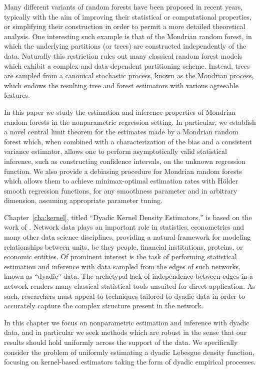 Many different variants of random forests have been proposed in
recent years, typically with the aim of improving their statistical or
computational properties, or simplifying their construction in order to
permit a more detailed theoretical analysis.
One interesting such example is that of the Mondrian random forest,
in which the underlying partitions (or trees) are constructed
independently of the data. Naturally this restriction rules out many
classical random forest models which exhibit a complex and data-dependent
partitioning scheme. Instead, trees are sampled from a canonical
stochastic process, known as the Mondrian process, which endows the resulting
tree and forest estimators with various agreeable features.

In this paper we study the estimation and inference properties of
Mondrian random forests in the nonparametric
regression setting. In particular, we
establish a novel central limit theorem for the estimates
made by a Mondrian random forest which,
when combined with a characterization of the bias and a
consistent variance estimator,
allows one to perform asymptotically valid statistical inference,
such as constructing confidence intervals,
on the unknown regression function.
We also provide a debiasing procedure for Mondrian random
forests which allows them to achieve minimax-optimal estimation rates
with H{\"o}lder smooth regression functions, for any smoothness parameter
and in arbitrary dimension, assuming appropriate parameter tuning.

Chapter~\ref{cha:kernel},
titled ``Dyadic Kernel Density Estimators,''
is based on the work of \cite{cattaneo2024uniform}.
Network data plays an important role in statistics,
econometrics and many other data science disciplines,
providing a natural framework for modeling relationships
between units, be they people, financial institutions,
proteins, or economic entities.
Of prominent interest is the task of performing statistical estimation
and inference with data sampled from the edges of such networks,
known as ``dyadic'' data.
The archetypal lack of independence between edges in a network
renders many classical statistical tools unsuited for direct application.
As such, researchers must appeal to techniques tailored to
dyadic data in order to accurately capture the complex structure
present in the network.

In this chapter we focus on nonparametric estimation and inference
with dyadic data, and in particular we seek methods which are robust
in the sense that our results should hold uniformly across the support
of the data.
We specifically consider the problem of uniformly estimating
a dyadic Lebesgue density function,
focusing on kernel-based estimators taking the form of
dyadic empirical processes.

